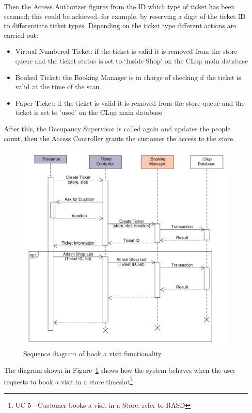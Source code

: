 Then the Access Authorizer figures from the ID which type of ticket has been scanned; this could be achieved, for example, by reserving a digit of the ticket ID to differentiate ticket types.
Depending on the ticket type different actions are carried out:
\begin{itemize}
    \item Virtual Numbered Ticket: if the ticket is valid it is removed from the store queue and the ticket status is set to `Inside Shop' on the CLup main database
    \item Booked Ticket: the Booking Manager is in charge of checking if the ticket is valid at the time of the scan
    \item Paper Ticket: if the ticket is valid it is removed from the store queue and the ticket is set to 'used' on the CLup main database
\end{itemize}

After this, the Occupancy Supervisor is called again and updates the people count, then the Access Controller grants the customer the access to the store.

\clearpage

\begin{figure}[H]
    \includegraphics[width=\textwidth]{Images/UML_user_book_visit.pdf}
    \caption{\label{fig:UML_user_book_visit}Sequence diagram of book a visit functionality}
\end{figure}
The diagram shown in Figure~\ref{fig:UML_user_book_visit} shows how the system behaves when the user requests to book a visit in a store timeslot\footnote{UC 5 - Customer books a visit in a Store, refer to RASD}

